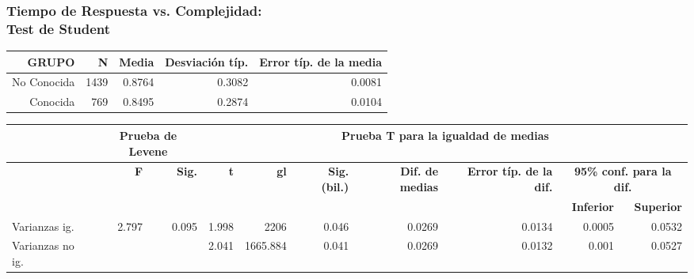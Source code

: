 \documentclass[10pt]{beamer}
\begin{document}
      \begin{frame}
      \tiny
	  \frametitle{Tiempo de Respuesta vs. Complejidad:\\Test de Student}
	\begin{table}
	  \begin{tabular}[t]{|r|r|r|r|r|}
	    \hline
		\textbf{GRUPO} & \textbf{N} & \textbf{Media} & \textbf{Desviación típ.} & \textbf{Error típ. de la media} \\ \hline
		No Conocida & 1439 & 0.8764 & 0.3082 & 0.0081 \\ \hline
		Conocida & 769 & 0.8495 & 0.2874 & 0.0104 \\ \hline
	  \end{tabular}
	  \begin{tabular}[t]{|l|r|r|r|r|r|r|r|r|r|}
	    \hline
		  & \multicolumn{2}{|c|}{\textbf{Prueba de Levene}} &  \multicolumn{7}{|c|}{\textbf{Prueba T para la igualdad de medias}} \\ \hline
		  & \textbf{F} & \textbf{Sig.} & \textbf{t} & \textbf{gl} & \textbf{Sig. (bil.)} & \textbf{Dif. de medias} & \textbf{Error típ. de la dif.} & \multicolumn{2}{|c|}{\textbf{95\% conf. para la dif.}} \\ \hline
		  &   &   &   &   &   &   &   & \textbf{Inferior} & \textbf{Superior} \\ \hline
		Varianzas ig. & 2.797 & 0.095 & 1.998 & 2206 & 0.046 & 0.0269 & 0.0134 & 0.0005 & 0.0532 \\ \hline
		Varianzas no ig. &   &   & 2.041 & 1665.884 & 0.041 & 0.0269 & 0.0132 & 0.001 & 0.0527 \\ \hline
	  \end{tabular}
	\end{table}


\end{frame}
\end{document}
